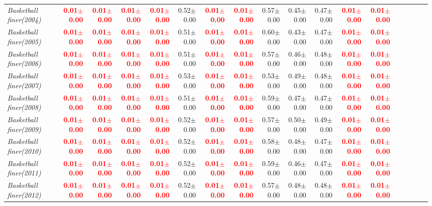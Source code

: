\documentclass[nohyperref]{article}
\theoremstyle{plain}
\theoremstyle{definition}
\theoremstyle{remark}
\newcommand{\red}[1]{\textcolor{red}{\textbf{#1}}}
\begin{document}
\begin{table*}[!ht]
{\begin{tabular}{lrrrrrrrrrrrrrrrrr}
			{\it Basketball finer(2004)} & \red{0.01$\pm$0.00} & \red{0.01$\pm$0.00} & \red{0.01$\pm$0.00} & \red{0.01$\pm$0.00} & 0.52$\pm$0.00 & \red{0.01$\pm$0.00} & \red{0.01$\pm$0.00} & 0.57$\pm$0.00 & 0.45$\pm$0.00 & 0.47$\pm$0.00 & \red{0.01$\pm$0.00} & \red{0.01$\pm$0.00} \\
			{\it Basketball finer(2005)} & \red{0.01$\pm$0.00} & \red{0.01$\pm$0.00} & \red{0.01$\pm$0.00} & \red{0.01$\pm$0.00} & 0.51$\pm$0.00 & \red{0.01$\pm$0.00} & \red{0.01$\pm$0.00} & 0.60$\pm$0.00 & 0.43$\pm$0.00 & 0.47$\pm$0.00 & \red{0.01$\pm$0.00} & \red{0.01$\pm$0.00} \\
			{\it Basketball finer(2006)} & \red{0.01$\pm$0.00} & \red{0.01$\pm$0.00} & \red{0.01$\pm$0.00} & \red{0.01$\pm$0.00} & 0.51$\pm$0.00 & \red{0.01$\pm$0.00} & \red{0.01$\pm$0.00} & 0.57$\pm$0.00 & 0.46$\pm$0.00 & 0.48$\pm$0.00 & \red{0.01$\pm$0.00} & \red{0.01$\pm$0.00} \\
			{\it Basketball finer(2007)} & \red{0.01$\pm$0.00} & \red{0.01$\pm$0.00} & \red{0.01$\pm$0.00} & \red{0.01$\pm$0.00} & 0.53$\pm$0.00 & \red{0.01$\pm$0.00} & \red{0.01$\pm$0.00} & 0.53$\pm$0.00 & 0.49$\pm$0.00 & 0.48$\pm$0.00 & \red{0.01$\pm$0.00} & \red{0.01$\pm$0.00} \\
			{\it Basketball finer(2008)} & \red{0.01$\pm$0.00} & \red{0.01$\pm$0.00} & \red{0.01$\pm$0.00} & \red{0.01$\pm$0.00} & 0.51$\pm$0.00 & \red{0.01$\pm$0.00} & \red{0.01$\pm$0.00} & 0.59$\pm$0.00 & 0.47$\pm$0.00 & 0.47$\pm$0.00 & \red{0.01$\pm$0.00} & \red{0.01$\pm$0.00} \\
			{\it Basketball finer(2009)} & \red{0.01$\pm$0.00} & \red{0.01$\pm$0.00} & \red{0.01$\pm$0.00} & \red{0.01$\pm$0.00} & 0.52$\pm$0.00 & \red{0.01$\pm$0.00} & \red{0.01$\pm$0.00} & 0.57$\pm$0.00 & 0.50$\pm$0.00 & 0.49$\pm$0.00 & \red{0.01$\pm$0.00} & \red{0.01$\pm$0.00} \\
			{\it Basketball finer(2010)} & \red{0.01$\pm$0.00} & \red{0.01$\pm$0.00} & \red{0.01$\pm$0.00} & \red{0.01$\pm$0.00} & 0.52$\pm$0.00 & \red{0.01$\pm$0.00} & \red{0.01$\pm$0.00} & 0.58$\pm$0.00 & 0.48$\pm$0.00 & 0.47$\pm$0.00 & \red{0.01$\pm$0.00} & \red{0.01$\pm$0.00} \\
			{\it Basketball finer(2011)} & \red{0.01$\pm$0.00} & \red{0.01$\pm$0.00} & \red{0.01$\pm$0.00} & \red{0.01$\pm$0.00} & 0.52$\pm$0.00 & \red{0.01$\pm$0.00} & \red{0.01$\pm$0.00} & 0.59$\pm$0.00 & 0.46$\pm$0.00 & 0.47$\pm$0.00 & \red{0.01$\pm$0.00} & \red{0.01$\pm$0.00} \\
			{\it Basketball finer(2012)} & \red{0.01$\pm$0.00} & \red{0.01$\pm$0.00} & \red{0.01$\pm$0.00} & \red{0.01$\pm$0.00} & 0.52$\pm$0.00 & \red{0.01$\pm$0.00} & \red{0.01$\pm$0.00} & 0.57$\pm$0.00 & 0.48$\pm$0.00 & 0.48$\pm$0.00 & \red{0.01$\pm$0.00} & \red{0.01$\pm$0.00} \\

\end{tabular}}
\end{table*}
\end{document}
